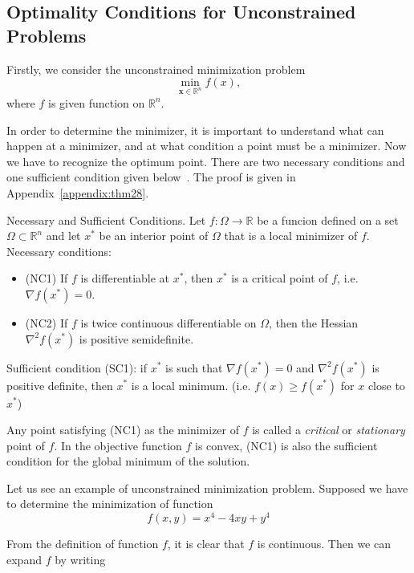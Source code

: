 \subsection{Optimality Conditions for Unconstrained Problems}
Firstly, we consider the unconstrained minimization problem
\begin{equation}
    \min _{\mathbf{x} \in \mathbb{R}^{n}} f(x),
\end{equation}
where $f$ is given function on $\mathbb{R}^n$. 
\par In order to determine the minimizer, it is important to understand what can happen at a minimizer, and at what condition a point must be a minimizer. Now we have to recognize the optimum point. There are two necessary conditions and one sufficient condition given below~\citep{JS:06}. The proof is given in Appendix~\ref{appendix:thm28}.
\begin{thm}{Necessary and Sufficient Conditions.}
    \label{thm28}
    Let $f:\Omega \rightarrow \mathbb{R}$ be a funcion defined on a set $\Omega \subset \mathbb{R}^n$ and let $x^*$ be an interior point of $\Omega$ that is a local minimizer of $f$. \\
    Necessary conditions:
    \begin{itemize}
        \item (NC1) If $f$ is differentiable at $x^*$, then $x^*$ is a critical point of $f$, i.e. $\nabla f\left(x^{*}\right)=0$.
        \item (NC2) If $f$ is twice continuous differentiable on $\Omega$, then the Hessian $\nabla^2 f\left(x^{*}\right)$ is positive semidefinite.
    \end{itemize}
    Sufficient condition (SC1): if $x^*$ is such that $\nabla f\left(x^{*}\right)=0$ and $\nabla^2 f\left(x^{*}\right)$ is positive definite, then $x^*$ is a local minimum. (i.e. $f(x) \geq f(x^*)$ for $x$ close to $x^*$)
\end{thm}
\par Any point satisfying (NC1) as the minimizer of $f$ is called a \emph{critical} or \emph{stationary} point of $f$. In the objective function $f$ is convex, (NC1) is also the sufficient condition for the global minimum of the solution. 
\par Let us see an example of unconstrained minimization problem. Supposed we have to determine the minimization of function
$$
f(x, y)=x^{4}-4 x y+y^{4}
$$
\par From the definition of function $f$, it is clear that $f$ is continuous. Then we can expand $f$ by writing
